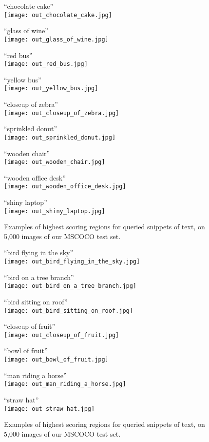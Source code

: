 \documentclass[10pt,twocolumn,letterpaper]{article}
\begin{document}
\begin{figure*}
\large
``chocolate cake''\\
\texttt{[image: out\_chocolate\_cake.jpg]}

``glass of wine''\\
\texttt{[image: out\_glass\_of\_wine.jpg]}

``red bus''\\
\texttt{[image: out\_red\_bus.jpg]}

``yellow bus''\\
\texttt{[image: out\_yellow\_bus.jpg]}

``closeup of zebra''\\
\texttt{[image: out\_closeup\_of\_zebra.jpg]}

``sprinkled donut''\\
\texttt{[image: out\_sprinkled\_donut.jpg]}

``wooden chair''\\
\texttt{[image: out\_wooden\_chair.jpg]}

``wooden office desk''\\
\texttt{[image: out\_wooden\_office\_desk.jpg]}

``shiny laptop''\\
\texttt{[image: out\_shiny\_laptop.jpg]}

\caption{Examples of highest scoring regions for queried snippets of text, on 5,000 images of our MSCOCO test set.}
\label{fig:textqueries}
\end{figure*}

\begin{figure*}
\large
``bird flying in the sky''\\
\texttt{[image: out\_bird\_flying\_in\_the\_sky.jpg]}

``bird on a tree branch''\\
\texttt{[image: out\_bird\_on\_a\_tree\_branch.jpg]}

``bird sitting on roof''\\
\texttt{[image: out\_bird\_sitting\_on\_roof.jpg]}

``closeup of fruit''\\
\texttt{[image: out\_closeup\_of\_fruit.jpg]}

``bowl of fruit''\\
\texttt{[image: out\_bowl\_of\_fruit.jpg]}

``man riding a horse''\\
\texttt{[image: out\_man\_riding\_a\_horse.jpg]}

``straw hat''\\
\texttt{[image: out\_straw\_hat.jpg]}

\caption{Examples of highest scoring regions for queried snippets of text, on 5,000 images of our MSCOCO test set.}
\label{fig:textqueries2}
\end{figure*}
\end{document}
